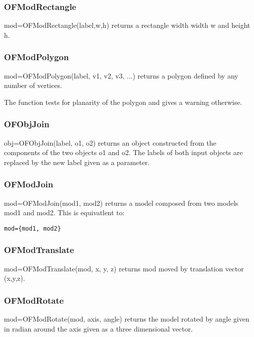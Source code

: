 \documentclass[a4paper]{article}
\begin{document}
\subsubsection{OFModRectangle}

mod=OFModRectangle(label,w,h) returns a rectangle width width w and
height h.

\subsubsection{OFModPolygon}

mod=OFModPolygon(label, v1, v2, v3, ...) returns a polygon defined by
any number of vertices.

The function tests for planarity of the polygon and gives a warning
otherwise.

\subsubsection{OFObjJoin}

obj=OFObjJoin(label, o1, o2) returns an object constructed from the
components of the two objects o1 and o2. The labels of both input
objects are replaced by the new label given as a parameter.

\subsubsection{OFModJoin}

mod=OFModJoin(mod1, mod2) returns a model composed from two models
mod1 and mod2. This is equivatlent to:

\begin{verbatim}
mod={mod1, mod2}
\end{verbatim}

\subsubsection{OFModTranslate}

mod=OFModTranslate(mod, x, y, z) returns mod moved by translation
vector (x,y,z).

\subsubsection{OFModRotate}

mod=OFModRotate(mod, axis, angle) returns the model rotated by angle
given in radian around the axis given as a three dimensional vector.
\end{document}
